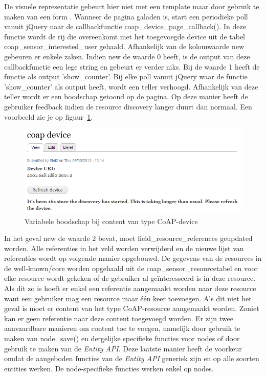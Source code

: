 De visuele representatie gebeurt hier niet met een template maar door gebruik te maken van een form \cite{formAPI}. Wanneer de pagina galaden is, start een periodieke poll vanuit jQuery naar de callbackfunctie coap\_device\_page\_callback(). In deze functie wordt de rij die overeenkomt met het toegevoegde device uit de tabel coap\_sensor\_interested\_user gehaald. Afhankelijk van de kolomwaarde new gebeuren er enkele zaken. Indien new de waarde 0 heeft, is de output van deze callbackfunctie een lege string en gebeurt er verder niks. Bij de waarde 1 heeft de functie als output 'show\_counter'. Bij elke poll vanuit jQuery waar de functie 'show\_counter' als output heeft, wordt een teller verhoogd. Afhankelijk van deze teller wordt er een boodschap getoond op de pagina. Op deze manier heeft de gebruiker feedback indien de resource discovery langer duurt dan normaal. Een voorbeeld zie je op figuur~\ref{fig:coapDeviceMessage}.
\begin{figure}[h!]
\centering
\includegraphics[width=1\textwidth]{fig/CoAPDeviceMessage}
\caption{Variabele boodschap bij content van type CoAP-device}
\label{fig:coapDeviceMessage}
\end{figure}

\noindent
In het geval new de waarde 2 bevat, moet field\_resource\_references geupdated worden. Alle referenties in het veld worden verwijderd en de nieuwe lijst van referenties wordt op volgende manier opgebouwd. De gegevens van de resources in de well-known/core worden opgehaald uit de coap\_sensor\_resourcetabel en voor elke resource wordt gekeken of de gebruiker al ge\"{i}nteresseerd is in deze resource. Als dit zo is hoeft er enkel een referentie aangemaakt worden naar deze resource want een gebruiker mag een resource maar \'{e}\'{e}n keer toevoegen. Als dit niet het geval is moet er content van het type CoAP-resource aangemaakt worden. Zoniet kan er geen referentie naar deze content toegevoegd worden. Er zijn twee aanvaardbare manieren om content toe te voegen, namelijk door gebruik te maken van node\_save() en dergelijke specifieke functies voor nodes of door gebruik te maken van de \textit{Entity API}. Deze laatste manier heeft de voorkeur omdat de aangeboden functies van de \textit{Entity API} generiek zijn en op alle soorten entities werken. De node-specifieke functies werken enkel op nodes.\\


